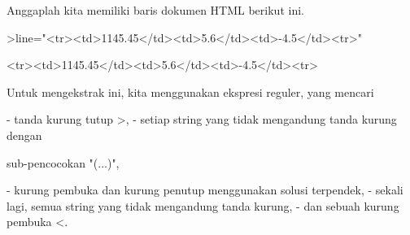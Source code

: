 \documentclass[a4paper,10pt]{article}
\begin{document}
\begin{eulernotebook}
\begin{eulercomment}
\begin{eulercomment}
\begin{eulercomment}
\begin{eulercomment}
\begin{eulercomment}
Anggaplah kita memiliki baris dokumen HTML berikut ini.
\end{eulercomment}
\begin{eulerprompt}
>line="<tr><td>1145.45</td><td>5.6</td><td>-4.5</td><tr>"
\end{eulerprompt}
\begin{euleroutput}
  <tr><td>1145.45</td><td>5.6</td><td>-4.5</td><tr>
\end{euleroutput}
\begin{eulercomment}
Untuk mengekstrak ini, kita menggunakan ekspresi reguler, yang mencari

\end{eulercomment}
\begin{eulerttcomment}
 - tanda kurung tutup >,
 - setiap string yang tidak mengandung tanda kurung dengan
\end{eulerttcomment}
\begin{eulercomment}
sub-pencocokan "(...)",\\
\end{eulercomment}
\begin{eulerttcomment}
 - kurung pembuka dan kurung penutup menggunakan solusi terpendek,
 - sekali lagi, semua string yang tidak mengandung tanda kurung,
 - dan sebuah kurung pembuka <.
\end{eulerttcomment}
\begin{eulercomment}


\end{eulercomment}
\end{eulercomment}
\end{eulercomment}
\end{eulercomment}
\end{eulercomment}
\end{eulernotebook}
\end{document}
